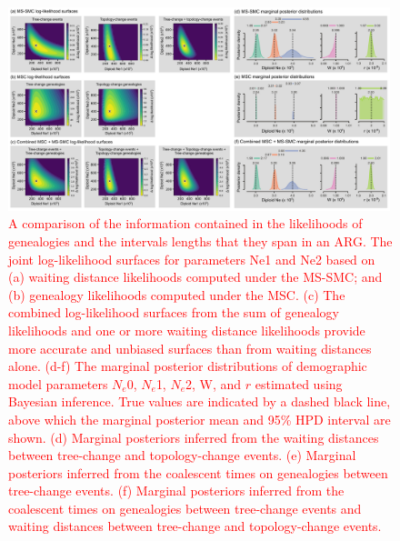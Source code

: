 \documentclass[11pt]{article}
\begin{document}
\begin{figure}[tbp!]
	\centering
	\includegraphics[width=0.99\textwidth]{figures/current/Fig8-MSC-SMC-surface-and-posterior2.pdf}		
	\caption{
		\textcolor{red}{
		A comparison of the information contained in the likelihoods of genealogies
		and the intervals lengths that they span in an ARG. 
		The joint log-likelihood surfaces for parameters Ne1 and Ne2 based on 
		(a) waiting distance likelihoods computed under the MS-SMC; and (b) genealogy
		likelihoods computed under the MSC. 
		(c) The combined log-likelihood surfaces from the sum of genealogy likelihoods
		and one or more waiting distance likelihoods provide more accurate
		and unbiased surfaces than from waiting distances alone. 
		(d-f) The marginal posterior distributions of demographic model parameters 
		$N_e$0, $N_e$1, $N_e$2, W, and $r$ estimated using Bayesian inference.
		True values are indicated by a dashed black line, above which the marginal
		posterior mean and 95\% HPD interval are shown.
		(d) Marginal posteriors inferred from the waiting distances between 
		tree-change and topology-change events.
		(e) Marginal posteriors inferred from the coalescent times on genealogies between 
		tree-change events.
		(f) Marginal posteriors inferred from the coalescent times on genealogies between 
		tree-change events and waiting distances between tree-change and topology-change events.
		}
	}
	\label{fig:likelihood-posteriors}
\end{figure}
\end{document}
